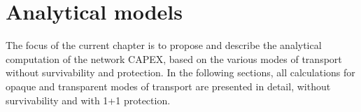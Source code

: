 
\chapter{Analytical models}
\label{chap_analytical}
The focus of the current chapter is to propose and describe the analytical computation of the network CAPEX, based on the various modes of transport without survivability and protection.
In the following sections, all calculations for opaque and transparent modes of transport are presented in detail, without survivability and with 1+1 protection.





